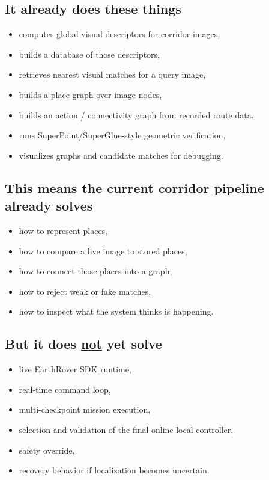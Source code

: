 \documentclass[11pt,a4paper]{article}
\begin{document}
\subsection*{It already does these things}

\begin{itemize}[nosep]
  \item computes global visual descriptors for corridor images,
  \item builds a database of those descriptors,
  \item retrieves nearest visual matches for a query image,
  \item builds a place graph over image nodes,
  \item builds an action / connectivity graph from recorded route data,
  \item runs SuperPoint/SuperGlue-style geometric verification,
  \item visualizes graphs and candidate matches for debugging.
\end{itemize}

\subsection*{This means the current corridor pipeline already solves}

\begin{itemize}[nosep]
  \item how to represent places,
  \item how to compare a live image to stored places,
  \item how to connect those places into a graph,
  \item how to reject weak or fake matches,
  \item how to inspect what the system thinks is happening.
\end{itemize}

\subsection*{But it does \underline{not} yet solve}

\begin{itemize}[nosep]
  \item live EarthRover SDK runtime,
  \item real-time command loop,
  \item multi-checkpoint mission execution,
  \item selection and validation of the final online local controller,
  \item safety override,
  \item recovery behavior if localization becomes uncertain.
\end{itemize}
\end{document}
